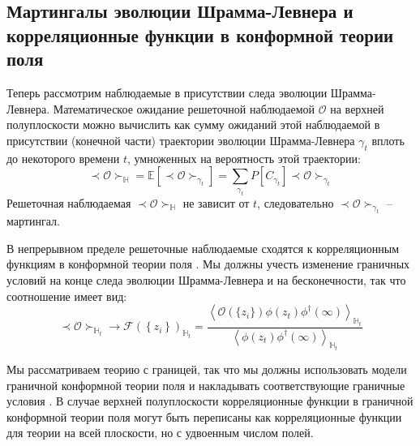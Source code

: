 \subsection{Мартингалы эволюции Шрамма-Левнера и корреляционные функции в конформной теории поля}
\label{sec:corr-betw-sle}

Теперь рассмотрим наблюдаемые в присутствии следа эволюции Шрамма-Левнера. Математическое ожидание решеточной наблюдаемой $\mathcal{O}$ на верхней полуплоскости можно вычислить как сумму ожиданий этой наблюдаемой в присутствии (конечной части) траектории эволюции Шрамма-Левнера  $\gamma_{t}$ вплоть до некоторого времени $t$, умноженных на вероятность этой траектории:
\begin{equation*}
  \prec \mathcal{O} \succ_{\mathbb{H}}=\mathbb{E}\left[\prec\mathcal{O}\succ_{\gamma_{t}}\right]=\sum_{\gamma_{t}} P\left[C_{\gamma_{t}}\right] \prec \mathcal{O} \succ_{\gamma_{t}}
\end{equation*}
Решеточная наблюдаемая  $\prec \mathcal{O} \succ_{\mathbb{H}}$ не зависит от  $t$, следовательно $\prec\mathcal{O}\succ_{\gamma_{t}}$ -- мартингал.

В непрерывном пределе решеточные наблюдаемые сходятся к корреляционным функциям в конформной теории поля \cite{bauer2003sle,bauer2003conformal,bauer2002sle}. Мы должны учесть изменение граничных условий на конце следа эволюции Шрамма-Левнера и на бесконечности, так что соотношение имеет вид:
\begin{equation}
  \prec \mathcal{O} \succ_{\mathbb{H}_{t}}\to \mathcal{F}(\left\{z_{i}\right\})_{\mathbb{H}_{t}}=
  \frac{\left< \mathcal{O}(\{z_{i}\})\phi(z_{t})\phi^{\dagger}(\infty)\right>_{\mathbb{H}_{t}}}{\left<\phi(z_{t})\phi^{\dagger}(\infty)\right>_{\mathbb{H}_{t}}}
\label{eq:21}
\end{equation}

Мы рассматриваем теорию с границей, так что мы должны использовать модели граничной конформной теории поля и накладывать соответствующие граничные условия \cite{cardy1984conformal,cardy1989boundary,cardy1991bulk}. В случае верхней полуплоскости корреляционные функции в граничной конформной теории поля могут быть переписаны как корреляционные функции для теории на всей плоскости, но с удвоенным числом полей.

